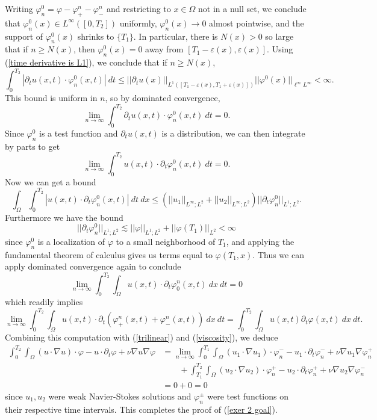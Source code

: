 \documentclass[10pt]{article}
\theoremstyle{definition}
\begin{document}
Writing $\varphi_n^0 = \varphi - \varphi_+^n - \varphi_-^n$ and restricting to $x \in \Omega$ not in a null set, we conclude that $\varphi_n^0(x) \in L^\infty([0, T_2])$ uniformly, $\varphi_n^0(x) \to 0$ almost pointwise, and the support of $\varphi_n^0(x)$ shrinks to $\{T_1\}$.
In particular, there is $N(x) > 0$ so large that if $n \geq N(x)$, then $\varphi_n^0(x) = 0$ away from $[T_1 - \varepsilon(x), \varepsilon(x)]$.
Using (\ref{time derivative is L1}), we conclude that if $n \geq N(x)$,
$$\int_0^{T_2} |\partial_t u(x, t) \cdot \varphi_n^0(x, t)| ~dt \leq ||\partial_t u(x)||_{L^1([T_1 - \varepsilon(x), T_1 + \varepsilon(x)])}  ||\varphi^0(x)||_{\ell^\infty L^\infty} < \infty.$$
This bound is uniform in $n$, so by dominated convergence,
$$\lim_{n \to \infty} \int_0^{T_2} \partial_t u(x, t) \cdot \varphi_n^0(x, t) ~dt = 0.$$
Since $\varphi_n^0$ is a test function and $\partial_t u(x, t)$ is a distribution, we can then integrate by parts to get
$$\lim_{n \to \infty} \int_0^{T_2} u(x, t) \cdot \partial_t \varphi_n^0(x, t) ~dt = 0.$$
Now we can get a bound
$$\int_\Omega \int_0^{T_2} |u(x, t) \cdot \partial_t \varphi_n^0(x, t)| ~dt ~dx \leq (||u_1||_{L^\infty;L^2} + ||u_2||_{L^\infty;L^2})||\partial_t \varphi_n^0||_{L^1;L^2}.$$
Furthermore we have the bound
$$||\partial_t \varphi_n^0||_{L^1;L^2} \lesssim ||\varphi||_{L^1;L^2} + ||\varphi(T_1)||_{L^2} < \infty$$
since $\varphi_n^0$ is a localization of $\varphi$ to a small neighborhood of $T_1$, and applying the fundamental theorem of calculus gives us terms equal to $\varphi(T_1, x)$.
Thus we can apply dominated convergence again to conclude
$$\lim_{n \to \infty} \int_0^{T_2} \int_\Omega u(x, t) \cdot \partial_t \varphi_0^n(x, t) ~dx ~dt = 0$$
which readily implies
$$\lim_{n \to \infty} \int_0^{T_2} \int_\Omega u(x, t) \cdot \partial_t (\varphi_+^n(x, t) + \varphi_-^n(x, t)) ~dx ~dt = \int_0^{T_2} \int_\Omega u(x, t) \partial_t \varphi(x, t) ~dx ~dt.$$
Combining this computation with (\ref{trilinear}) and (\ref{viscosity}), we deduce
\begin{align*}
\int_0^{T_2} \int_\Omega (u \cdot \nabla u) \cdot \varphi - u \cdot \partial_t \varphi + \nu \nabla u \nabla \varphi
&= \lim_{n \to \infty} \int_0^{T_1} \int_\Omega (u_1 \cdot \nabla u_1) \cdot \varphi_n^- - u_1 \cdot \partial_t \varphi_n^- + \nu \nabla u_1 \nabla \varphi_n^+ \\
&\qquad + \int_{T_1}^{T_2} \int_\Omega (u_2 \cdot \nabla u_2) \cdot \varphi_n^+ - u_2 \cdot \partial_t \varphi_n^+ + \nu \nabla u_2 \nabla \varphi_n^-\\
&= 0 + 0 = 0
\end{align*}
since $u_1, u_2$ were weak Navier-Stokes solutions and $\varphi_n^\pm$ were test functions on their respective time intervals.
This completes the proof of (\ref{exer 2 goal}).
\end{document}

